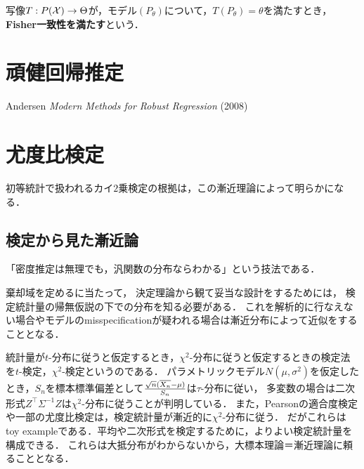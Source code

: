\documentclass[uplatex,dvipdfmx]{jsreport}
\begin{document}
\begin{definition}
    写像$T:P(\mathcal{X})\to\Theta$が，モデル$(P_\theta)$について，$T(P_\theta)=\theta$を満たすとき，\textbf{Fisher一致性を満たす}という．
\end{definition}

\section{頑健回帰推定}

\begin{tcolorbox}[colframe=ForestGreen, colback=ForestGreen!10!white,breakable,colbacktitle=ForestGreen!40!white,coltitle=black,fonttitle=\bfseries\sffamily,
title=]
    Andersen \textit{Modern Methods for Robust Regression} (2008)
    
\end{tcolorbox}

\section{尤度比検定}

\begin{tcolorbox}[colframe=ForestGreen, colback=ForestGreen!10!white,breakable,colbacktitle=ForestGreen!40!white,coltitle=black,fonttitle=\bfseries\sffamily,
title=]
    初等統計で扱われるカイ$2$乗検定の根拠は，この漸近理論によって明らかになる．
\end{tcolorbox}

\subsection{検定から見た漸近論}

\begin{tcolorbox}[colframe=ForestGreen, colback=ForestGreen!10!white,breakable,colbacktitle=ForestGreen!40!white,coltitle=black,fonttitle=\bfseries\sffamily,
title=]
    「密度推定は無理でも，汎関数の分布ならわかる」という技法である．
\end{tcolorbox}

棄却域を定めるに当たって，
決定理論から観て妥当な設計をするためには，
検定統計量の帰無仮説の下での分布を知る必要がある．
これを解析的に行なえない場合やモデルのmisspecificationが疑われる場合は漸近分布によって近似をすることとなる．

統計量が$t$-分布に従うと仮定するとき，$\chi^2$-分布に従うと仮定するときの検定法を$t$-検定，$\chi^2$-検定というのである．
パラメトリックモデル$N(\mu,\sigma^2)$を仮定したとき，$S_n$を標本標準偏差として$\frac{\sqrt{n}(\overline{X_n}-\mu)}{S_n}$は$\tau$-分布に従い，
多変数の場合は二次形式$Z^\top\Sigma^{-1}Z$は$\chi^2$-分布に従うことが判明している．
また，Pearsonの適合度検定や一部の尤度比検定は，検定統計量が漸近的に$\chi^2$-分布に従う．
だがこれらはtoy exampleである．平均や二次形式を検定するために，よりよい検定統計量を構成できる．
これらは大抵分布がわからないから，大標本理論＝漸近理論に頼ることとなる．
\end{document}
